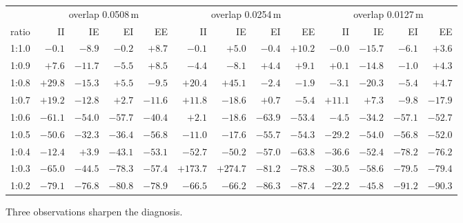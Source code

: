 \documentclass[11pt]{article}
\begin{document}
\begin{center}
\small\setlength{\tabcolsep}{3.6pt}
\begin{tabular}{l rrrr rrrr rrrr}
\toprule
& \multicolumn{4}{c}{overlap 0.0508\,m} & \multicolumn{4}{c}{overlap 0.0254\,m}
& \multicolumn{4}{c}{overlap 0.0127\,m} \\
\cmidrule(lr){2-5}\cmidrule(lr){6-9}\cmidrule(lr){10-13}
ratio & II & IE & EI & EE & II & IE & EI & EE & II & IE & EI & EE \\
\midrule
1:1.0 & $-0.1$ & $-8.9$ & $-0.2$ & $+8.7$ & $-0.1$ & $+5.0$ & $-0.4$ & $+10.2$ & $-0.0$ & $-15.7$ & $-6.1$ & $+3.6$ \\
1:0.9 & $+7.6$ & $-11.7$ & $-5.5$ & $+8.5$ & $-4.4$ & $-8.1$ & $+4.4$ & $+9.1$ & $+0.1$ & $-14.8$ & $-1.0$ & $+4.3$ \\
1:0.8 & $\mathbf{+29.8}$ & $-15.3$ & $+5.5$ & $-9.5$ & $+20.4$ & $\mathbf{+45.1}$ & $-2.4$ & $-1.9$ & $-3.1$ & $-20.3$ & $-5.4$ & $+4.7$ \\
1:0.7 & $+19.2$ & $-12.8$ & $+2.7$ & $-11.6$ & $+11.8$ & $-18.6$ & $+0.7$ & $-5.4$ & $+11.1$ & $+7.3$ & $-9.8$ & $-17.9$ \\
1:0.6 & $-61.1$ & $-54.0$ & $-57.7$ & $-40.4$ & $+2.1$ & $-18.6$ & $-63.9$ & $-53.4$ & $-4.5$ & $-34.2$ & $-57.1$ & $-52.7$ \\
1:0.5 & $-50.6$ & $-32.3$ & $-36.4$ & $-56.8$ & $-11.0$ & $-17.6$ & $-55.7$ & $-54.3$ & $-29.2$ & $-54.0$ & $-56.8$ & $-52.0$ \\
1:0.4 & $-12.4$ & $+3.9$ & $-43.1$ & $-53.1$ & $-52.7$ & $-50.2$ & $-57.0$ & $-63.8$ & $-36.6$ & $-52.4$ & $-78.2$ & $-76.2$ \\
1:0.3 & $-65.0$ & $-44.5$ & $-78.3$ & $-57.4$ & $\mathbf{+173.7}$ & $\mathbf{+274.7}$ & $-81.2$ & $-78.8$ & $-30.5$ & $-58.6$ & $-79.5$ & $-79.4$ \\
1:0.2 & $-79.1$ & $-76.8$ & $-80.8$ & $-78.9$ & $-66.5$ & $-66.2$ & $-86.3$ & $-87.4$ & $-22.2$ & $-45.8$ & $-91.2$ & $-90.3$ \\
\bottomrule
\end{tabular}
\end{center}

Three observations sharpen the diagnosis.
\end{document}
